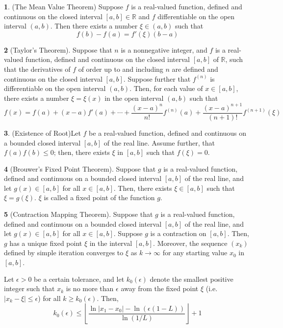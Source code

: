 \documentclass[12pt]{article}
\theoremstyle{definition}
\newtheorem{theorem}{\color{ForestGreen}{\textbf{Theorem}}}
\newcommand{\R}{\mathbb{R}}
\begin{document}
\begin{theorem}(The Mean Value Theorem)
Suppose $f$ is a real-valued function, defined and continuous on the closed interval $[a,b] \in \R$ and $f$ differentiable on the open interval $(a,b)$. Then there exists a number $\xi \in (a,b)$ such that
\begin{equation}
f(b) - f(a) = f'(\xi) (b - a)
\end{equation}
\end{theorem}

\begin{theorem}[Taylor's Theorem]
Suppose that $n$ is a nonnegative integer, and $f$ is a real-valued function, defined and continuous on the closed interval $[a,b]$ of $\R$, such that the derivatives of $f$ of order up to and including $n$ are defined and continuous on the closed interval $[a,b]$. Suppose further that $f^{(n)}$ is differentiable on the open interval $(a,b)$. Then, for each value of $x \in [a,b]$, there exists a number $\xi = \xi(x)$ in the open interval $(a,b)$ such that
\begin{equation}
f(x) = f(a) + (x-a)f'(a) + \cdots + \frac{(x-a)^n}{n!} f^{(n)}(a) + \frac{(x-a)^{n+1}}{(n+1)!} f^{(n+1)}(\xi)
\end{equation}
\end{theorem}

\begin{theorem}(Existence of Root)\label{zeroexists}
Let $f$ be a real-valued function, defined and continuous on a bounded closed interval $[a,b]$ of the real line. Assume further, that $f(a)f(b) \leq 0$; then, there exists $\xi$ in $[a,b]$ such that $f(\xi) = 0$.
\end{theorem}

\begin{theorem}[Brouwer's Fixed Point Theorem]
Suppose that $g$ is a real-valued function, defined and continuous on a bounded closed interval $[a,b]$ of the real line, and let $g(x) \in [a,b]$ for all $x \in [a,b]$. Then, there exists $\xi \in [a,b]$ such that $\xi = g(\xi)$. $\xi$ is called a fixed point of the function $g$.
\end{theorem}

\begin{theorem}[Contraction Mapping Theorem]
Suppose that $g$ is a real-valued function, defined and continuous on a bounded closed interval $[a,b]$ of the real line, and let $g(x) \in [a,b]$ for all $x \in [a,b]$. Suppose $g$ is a contraction on $[a,b]$. Then, $g$ has a unique fixed point $\xi$ in the interval $[a,b]$. Moreover, the sequence $(x_k)$ defined by simple iteration converges to $\xi$ as $k \to \infty$ for any starting value $x_0$ in $[a,b]$.

Let $\epsilon > 0$ be a certain tolerance, and let $k_0 (\epsilon)$ denote the smallest positive integer such that $x_k$ is no more than $\epsilon$ away from the fixed point $\xi$ (i.e. $|x_k - \xi| \leq \epsilon$) for all $k \geq k_0 (\epsilon)$. Then,
\begin{equation}
k_0 (\epsilon) \leq \left\lfloor \frac{\ln|x_1 - x_0| - \ln(\epsilon (1 - L))}{\ln (1 / L)}\right\rfloor + 1
\end{equation}
\end{theorem}
\end{document}
